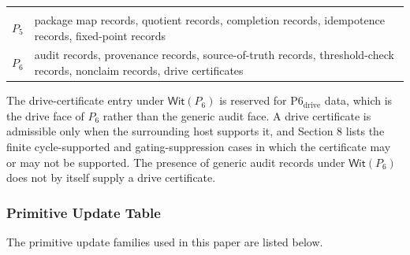 \documentclass[11pt]{article}
\theoremstyle{definition}
\begin{document}
\begin{longtable}[]{@{}ll@{}}
\begin{minipage}[t]{0.47\columnwidth}
\end{minipage}\tabularnewline
\begin{minipage}[t]{0.47\columnwidth}\raggedright
\(P_5\)\strut
\end{minipage} & \begin{minipage}[t]{0.47\columnwidth}\raggedright
package map records, quotient records, completion records, idempotence records, fixed-point records\strut
\end{minipage}\tabularnewline
\begin{minipage}[t]{0.47\columnwidth}\raggedright
\(P_6\)\strut
\end{minipage} & \begin{minipage}[t]{0.47\columnwidth}\raggedright
audit records, provenance records, source-of-truth records, threshold-check records, nonclaim records, drive certificates\strut
\end{minipage}\tabularnewline
\bottomrule
\end{longtable}

The drive-certificate entry under \(\mathsf{Wit}(P_6)\) is reserved for \(\mathrm{P6}_{\mathrm{drive}}\) data, which is the drive face of \(P_6\) rather than the generic audit face. A drive certificate is admissible only when the surrounding host supports it, and Section 8 lists the finite cycle-supported and gating-suppression cases in which the certificate may or may not be supported. The presence of generic audit records under \(\mathsf{Wit}(P_6)\) does not by itself supply a drive certificate.

\subsubsection{Primitive Update Table}

The primitive update families used in this paper are listed below.
\end{document}
